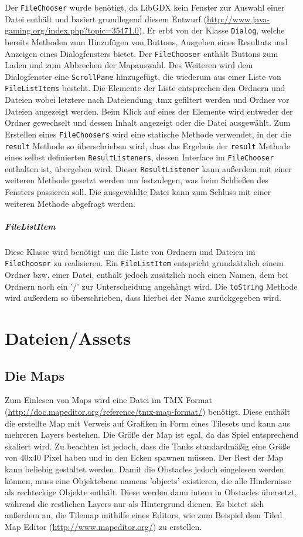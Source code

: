 \documentclass[a4paper]{scrreprt}
\def\code#1{\texttt{#1}}
\begin{document}
Der \code{FileChooser} wurde benötigt, da LibGDX kein Fenster zur Auswahl einer Datei enthält und basiert grundlegend diesem Entwurf (\url{http://www.java-gaming.org/index.php?topic=35471.0}).
Er erbt von der Klasse \code{Dialog}, welche bereits Methoden zum Hinzufügen von Buttons, Ausgeben eines Resultats und Anzeigen eines Dialogfensters bietet. Der \code{FileChooser} enthält Buttons zum Laden und zum Abbrechen der Mapauswahl. Des Weiteren wird dem Dialogfenster eine \code{ScrollPane} hinzugefügt, die wiederum aus einer Liste von \code{FileListItems} besteht. Die Elemente der Liste entsprechen den Ordnern und Dateien wobei letztere nach Dateiendung .tmx gefiltert werden und Ordner vor Dateien angezeigt werden. Beim Klick auf eines der Elemente wird entweder der Ordner gewechselt und dessen Inhalt angezeigt oder die Datei ausgewählt. Zum Erstellen eines \code{FileChoosers} wird eine statische Methode verwendet, in der die \code{result} Methode so überschrieben wird, dass das Ergebnis der \code{result} Methode eines selbst definierten \code{ResultListeners}, dessen Interface im \code{FileChooser} enthalten ist, übergeben wird. Dieser \code{ResultListener} kann außerdem mit einer weiteren Methode gesetzt werden um festzulegen, was beim Schließen des Fensters passieren soll. Die ausgewählte Datei kann zum Schluss mit einer weiteren Methode abgefragt werden.

\subparagraph{FileListItem}
Diese Klasse wird benötigt um die Liste von Ordnern und Dateien im \code{FileChooser} zu realisieren. Ein \code{FileListItem} entspricht grundsätzlich einem Ordner bzw. einer Datei, enthält jedoch zusätzlich noch einen Namen, dem bei Ordnern noch ein '/' zur Unterscheidung angehängt wird. Die \code{toString} Methode wird außerdem so überschrieben, dass hierbei der Name zurückgegeben wird.

\newpage
\section{Dateien/Assets}
\subsection{Die Maps}
Zum Einlesen von Maps wird eine Datei im TMX Format (\url{http://doc.mapeditor.org/reference/tmx-map-format/}) benötigt. Diese enthält die erstellte Map mit Verweis auf Grafiken in Form eines Tilesets und kann aus mehreren Layers bestehen. Die Größe der Map ist egal, da das Spiel entsprechend skaliert wird. Zu beachten ist jedoch, dass die Tanks standardmäßig eine Größe von 40x40 Pixel haben und in den Ecken spawnen müssen. Der Rest der Map kann beliebig gestaltet werden. Damit die Obstacles jedoch eingelesen werden können, muss eine Objektebene namens 'objects' existieren, die alle Hindernisse als rechteckige Objekte enthält. Diese werden dann intern in Obstacles übersetzt, während die restlichen Layers nur als Hintergrund dienen.
Es bietet sich außerdem an, die Tilemap mithilfe eines Editors, wie zum Beispiel dem Tiled Map Editor (\url{http://www.mapeditor.org/}) zu erstellen.
\end{document}
